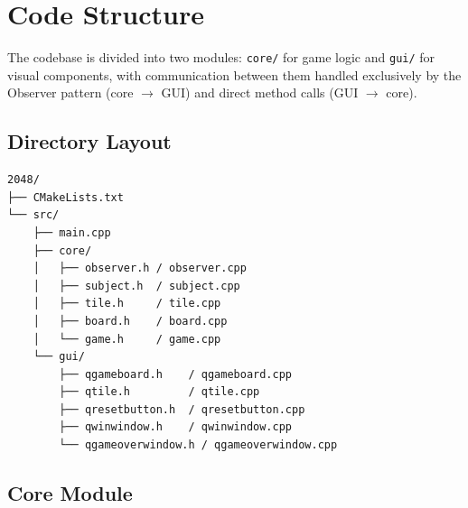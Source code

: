 \documentclass[a4paper,12pt]{article}
\begin{document}
\section{Code Structure}

The codebase is divided into two modules: \texttt{core/} for game logic and \texttt{gui/} for visual components, with communication between them handled exclusively by the Observer pattern (core $\rightarrow$ GUI) and direct method calls (GUI $\rightarrow$ core).

\subsection{Directory Layout}

\begin{verbatim}
2048/
├── CMakeLists.txt
└── src/
    ├── main.cpp
    ├── core/
    │   ├── observer.h / observer.cpp
    │   ├── subject.h  / subject.cpp
    │   ├── tile.h     / tile.cpp
    │   ├── board.h    / board.cpp
    │   └── game.h     / game.cpp
    └── gui/
        ├── qgameboard.h    / qgameboard.cpp
        ├── qtile.h         / qtile.cpp
        ├── qresetbutton.h  / qresetbutton.cpp
        ├── qwinwindow.h    / qwinwindow.cpp
        └── qgameoverwindow.h / qgameoverwindow.cpp
\end{verbatim}

\subsection{Core Module}
\end{document}

